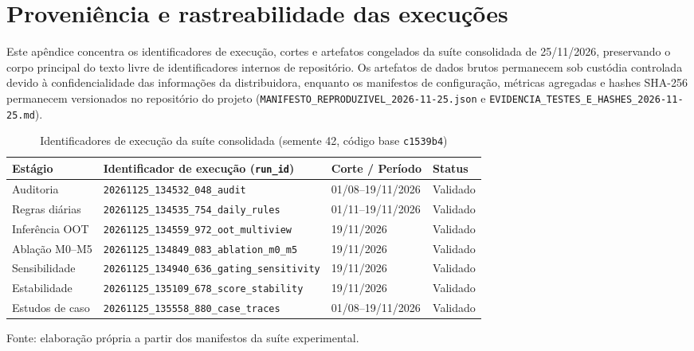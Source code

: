 \chapter{Proveniência e rastreabilidade das execuções}\label{ap:proveniencia}

Este apêndice concentra os identificadores de execução, cortes e artefatos congelados da suíte consolidada de 25/11/2026, preservando o corpo principal do texto livre de identificadores internos de repositório. Os artefatos de dados brutos permanecem sob custódia controlada devido à confidencialidade das informações da distribuidora, enquanto os manifestos de configuração, métricas agregadas e hashes SHA-256 permanecem versionados no repositório do projeto (\texttt{MANIFESTO\_REPRODUZIVEL\_2026-11-25.json} e \texttt{EVIDENCIA\_TESTES\_E\_HASHES\_2026-11-25.md}).

\begin{table}[htbp]\centering\footnotesize\caption{Identificadores de execução da suíte consolidada (semente 42, código base \texttt{c1539b4})}\label{tab:ap-proveniencia}
\begin{tabular}{llll}\toprule
Estágio & Identificador de execução (\texttt{run\_id}) & Corte / Período & Status \\ \midrule
Auditoria & \texttt{20261125\_134532\_048\_audit} & 01/08--19/11/2026 & Validado \\
Regras diárias & \texttt{20261125\_134535\_754\_daily\_rules} & 01/11--19/11/2026 & Validado \\
Inferência OOT & \texttt{20261125\_134559\_972\_oot\_multiview} & 19/11/2026 & Validado \\
Ablação M0--M5 & \texttt{20261125\_134849\_083\_ablation\_m0\_m5} & 19/11/2026 & Validado \\
Sensibilidade & \texttt{20261125\_134940\_636\_gating\_sensitivity} & 19/11/2026 & Validado \\
Estabilidade & \texttt{20261125\_135109\_678\_score\_stability} & 19/11/2026 & Validado \\
Estudos de caso & \texttt{20261125\_135558\_880\_case\_traces} & 01/08--19/11/2026 & Validado \\
\bottomrule\end{tabular}
\par\small Fonte: elaboração própria a partir dos manifestos da suíte experimental.
\end{table}
